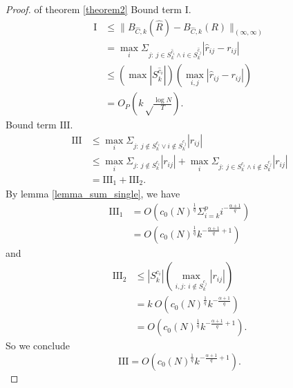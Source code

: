 \begin{proof}{of theorem \ref{theorem2}}
Bound term $\mathrm{I}$. 
\begin{equation}
	\begin{split}
	    \mathrm{I} &\leq \| B_{\hat{C}, k}(\hat R) - B_{\hat{C}, k}(R) \|_{(\infty, 
	        \infty)} \\
    	&= \max_i \Sigma_{j:\ j\in S_{k}^{\hat c_i} \land i\in S_{k}^{\hat c_j}} |\hat 
    	    r_{ij} - r_{ij}| \\
        &\leq (\max |S_{k}^{\hat c_i}|)  (\max_{i,j} 
            |\hat r_{ij} - r_{ij}|)  \\
        &= O_P(k \sqrt\frac{\log N}{T}). 
	\end{split}  
	\label{I res}
  \end{equation}
Bound term $\mathrm{III}$. 
\begin{equation}
    \begin{split}
	    \mathrm{III} &\leq \max_i \Sigma_{j:\ j \notin S_{k}^{c_i} \lor i 
	        \notin  S_{k}^{c_j}} |r_{ij}| \\
    	&\leq \max_i \Sigma_{j:\ j \notin S_{k}^{c_i}} |r_{ij}| + \max_i \Sigma_{j:\
    	    j\in S_{k}^{c_i} \land i\notin S_{k}^{c_j}} |r_{ij}|  \\
		&= \mathrm{III_1} + \mathrm{III_2}.
    \end{split}  
    \label{III}  
\end{equation}
By lemma \ref{lemma_sum_single}, we have 
\begin{equation}
	\begin{split}
		\mathrm{III_1}  &= O(  c_0(N)^{\frac{1}{q}} \Sigma_{i=k}^p 
		    i^{-\frac{\alpha+1}{q}}  ) \\
  	    &= O( c_0(N)^{\frac{1}{q}} k^{-\frac{\alpha+1}{q}+1} )
    \end{split}
\end{equation}
and 
\begin{equation}
	\begin{split}
		\mathrm{III_2} &\leq |S_{k}^{c_i}| ( \max_{i,j:\ i\notin S_{k}^{c_j}} |r_{ij}| )     \\
        &= k \ O( c_0(N)^{\frac{1}{q}} k^{-\frac{\alpha+1}{q}})  \\
        &= O( c_0(N)^{\frac{1}{q}} k^{-\frac{\alpha+1}{q}+1} ).
	\end{split}
\end{equation}
So we conclude 
\begin{equation}
    \mathrm{III} = O( c_0(N)^{\frac{1}{q}} k^{-\frac{\alpha+1}{q}+1} ). 
    \label{III res}
\end{equation}
    

\end{proof}
